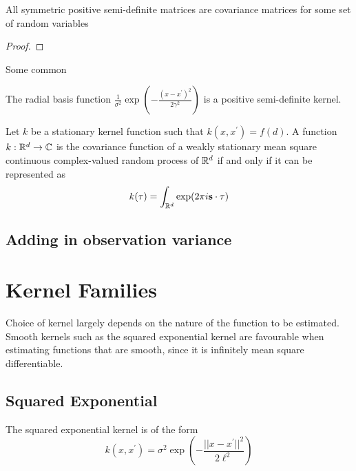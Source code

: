 \begin{theorem}
    All symmetric positive semi-definite matrices are covariance matrices for
    some set of random variables
\end{theorem}
\begin{proof}
\end{proof}

Some common


\begin{theorem}\label{thm:rbf_pos_def}
    The radial basis function
    $\frac{1}{\sigma^2}\exp(-\frac{(x - x^\prime)^2}{2\gamma^2})$ is a positive
    semi-definite kernel.
\end{theorem}

\begin{theorem}
    Let $k$ be a stationary kernel function such that
    $k(x, x^\prime) = f(d)$. A function $k:\mathbb{R}^d\to\mathbb{C}$ is the covariance
    function of a weakly
    stationary mean square continuous complex-valued random process of $\mathbb{R}^d$
    if and only if it can be represented as
    $$k(\mathbf{\tau}) = \int_{\mathbb{R}^d} \exp(2\pi i \mathbf{s}\cdot\mathbf{\tau})$$
\end{theorem}

\parencite[82]{rasmussen_gaussian_2008}

\subsection*{Adding in observation variance}

\section{Kernel Families}

Choice of kernel largely depends on the nature of the function to be estimated. Smooth kernels such as the squared exponential kernel are favourable when estimating functions that are smooth, since it is infinitely mean square differentiable.

\subsection*{Squared Exponential}

The squared exponential kernel is of the form
$$k(x, x^\prime)
    = \sigma^2\exp\left(-\frac{||x - x^\prime||^2}{2\ell^2}\right)$$


